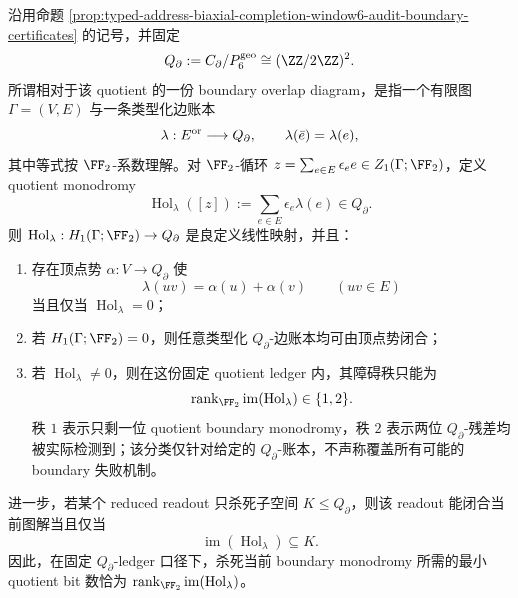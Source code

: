 \begin{proposition}
\label{distill:euclid_elements-diagrammatic_compatibility_audit_families-window6-quotient-ledger-relative-classification}
沿用命题 \ref{prop:typed-address-biaxial-completion-window6-audit-boundary-certificates} 的记号，并固定
\[
Q_{\partial}:=C_{\partial}/P_6^{\mathrm{geo}}\cong(\ZZ/2\ZZ)^2.
\]
所谓相对于该 quotient 的一份 boundary overlap diagram，是指一个有限图 \(\Gamma=(V,E)\) 与一条类型化边账本
\[
\lambda:E^{\rm or}\longrightarrow Q_{\partial},
\qquad
\lambda(\bar e)=\lambda(e),
\]
其中等式按 \(\FF_2\)-系数理解。对 \(\FF_2\)-循环 \(z=\sum_{e\in E} \epsilon_e e\in Z_1(\Gamma;\FF_2)\)，定义 quotient monodromy
\[
\operatorname{Hol}_{\lambda}([z])
:=
\sum_{e\in E}\epsilon_e\lambda(e)\in Q_{\partial}.
\]
则 \(\operatorname{Hol}_{\lambda}:H_1(\Gamma;\FF_2)\to Q_{\partial}\) 是良定义线性映射，并且：
\begin{enumerate}
  \item 存在顶点势 \(\alpha:V\to Q_{\partial}\) 使
  \[
  \lambda(uv)=\alpha(u)+\alpha(v)\qquad(uv\in E)
  \]
  当且仅当 \(\operatorname{Hol}_{\lambda}=0\)；
  \item 若 \(H_1(\Gamma;\FF_2)=0\)，则任意类型化 \(Q_{\partial}\)-边账本均可由顶点势闭合；
  \item 若 \(\operatorname{Hol}_{\lambda}\ne0\)，则在这份固定 quotient ledger 内，其障碍秩只能为
  \[
  \operatorname{rank}_{\FF_2}\operatorname{im}(\operatorname{Hol}_{\lambda})\in\{1,2\}.
  \]
  秩 \(1\) 表示只剩一位 quotient boundary monodromy，秩 \(2\) 表示两位 \(Q_{\partial}\)-残差均被实际检测到；该分类仅针对给定的 \(Q_{\partial}\)-账本，不声称覆盖所有可能的 boundary 失败机制。
\end{enumerate}
进一步，若某个 reduced readout 只杀死子空间 \(K\le Q_{\partial}\)，则该 readout 能闭合当前图解当且仅当
\[
\operatorname{im}(\operatorname{Hol}_{\lambda})\subseteq K.
\]
因此，在固定 \(Q_{\partial}\)-ledger 口径下，杀死当前 boundary monodromy 所需的最小 quotient bit 数恰为 \(\operatorname{rank}_{\FF_2}\operatorname{im}(\operatorname{Hol}_{\lambda})\)。
\end{proposition}
